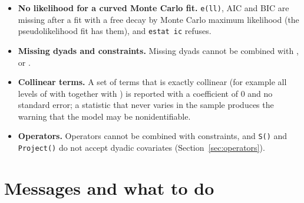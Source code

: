 \begin{itemize}
  \item \textbf{No likelihood for a curved Monte Carlo fit.} \texttt{e(ll)}, AIC and BIC are missing after a fit with a free decay by Monte Carlo maximum likelihood (the pseudolikelihood fit has them), and \texttt{estat ic} refuses.
  \item \textbf{Missing dyads and constraints.} Missing dyads cannot be combined with ,  or .
  \item \textbf{Collinear terms.} A set of terms that is exactly collinear (for example all levels of  with  together with ) is reported with a coefficient of 0 and no standard error; a statistic that never varies in the sample produces the warning that the model may be nonidentifiable.
  \item \textbf{Operators.} Operators cannot be combined with constraints, and \texttt{S()} and \texttt{Project()} do not accept dyadic covariates (Section~\ref{sec:operators}).
\end{itemize}

\section{Messages and what to do}\label{sec:messages}

